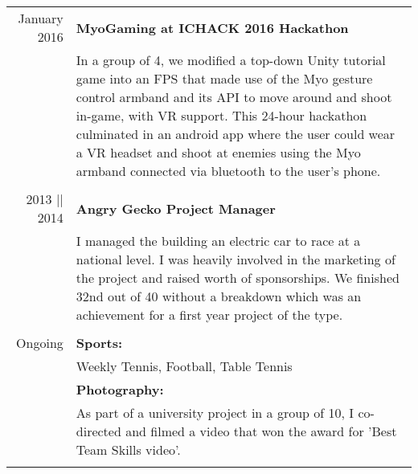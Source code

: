 \documentclass[a4paper,10pt]{article}
\begin{document}
	\begin{tabular}{r|p{12cm}}
		January 2016 & \textbf{MyoGaming at ICHACK 2016 Hackathon} \\&In a group of 4, we modified a top-down Unity tutorial game into an FPS that made use of the Myo gesture control armband and its API to move around and shoot in-game, with VR support.
		This 24-hour hackathon culminated in an android app where the user could wear a VR headset and shoot at enemies using the Myo armband connected via bluetooth to the user's phone.
		\\\multicolumn{2}{c}{} \\
		
		2013 || 2014 & \textbf{Angry Gecko Project Manager} \\& I managed the building an electric car to race at a national level. I was heavily involved in the marketing 		of the project and raised \textsterling700 worth of sponsorships. We finished 32nd out of 40 without a breakdown which was an achievement for a first year project of the type. 
		\\\multicolumn{2}{c}{} \\
		
		Ongoing & \textbf{Sports:} \\& Weekly Tennis, Football, Table Tennis \\& \textbf{Photography:} \\& As part of a university project in a group of 10, I co-directed and filmed a video that won the award for 'Best Team Skills video'.
		\\\multicolumn{2}{c}{} \\
		
	\end{tabular}
	
	
	
	
\end{document}

